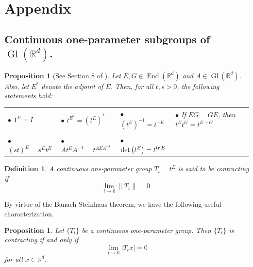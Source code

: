 \documentclass[11pt]{article}
\newtheorem{definition}[theorem]{Definition}
\newtheorem{proposition}[theorem]{Proposition}
\newcommand\End{\operatorname{End}} %
\newcommand\Gl{\operatorname{Gl}} %
\renewcommand\det{\operatorname{det}}
\begin{document}
\section{Appendix}\label{sec:Appendix}
\subsection{Continuous one-parameter subgroups of $\Gl(\mathbb{R}^d)$.}\label{subsec:OneParameterGroups}

\begin{proposition}[See Section 8 of \cite{Randles2017}]\label{prop:ContinuousGroupProperties}
Let $E,G\in\End(\mathbb{R}^d)$ and $A\in\Gl(\mathbb{R}^d)$. Also, let $E^*$ denote the adjoint of $E$. Then, for all $t,s>0$, the following statements hold:

\vspace{.3cm}
\begin{tabular}{lllll}
$\bullet$ $1^E=I$ &  $\bullet$ $t^{E^*}=(t^E)^*$ & $\bullet$ $(t^E)^{-1}=t^{-E}$ &   $\bullet$ If $EG=GE$, then $t^Et^G=t^{E+G}$\\
\vspace{.1cm}\\
$\bullet$ $(st)^E=s^Et^E$ & $\bullet$ $At^EA^{-1}=t^{AEA^{-1}}$&  $\bullet$ $\det\left(t^E\right)=t^{\tr E}$\\

\end{tabular}
\end{proposition}

\begin{definition} A continuous one-parameter group $T_t=t^E$ is said to be \textit{contracting} if
\begin{equation*}
\lim_{t\to 0}\|T_t\|=0. 
\end{equation*}
\end{definition}
\noindent By virtue of the Banach-Steinhaus theorem, we have the following useful characterization.
\begin{proposition}\label{prop:ContractingCharacterization}
Let $\{T_t\}$ be a continuous one-parameter group. Then $\{T_t\}$ is contracting if and only if
\begin{equation}\label{eq:ContractingSufficient}
\lim_{t\to 0}|T_tx|=0
\end{equation}
for all $x\in\mathbb{R}^d$.
\end{proposition}
\end{document}

